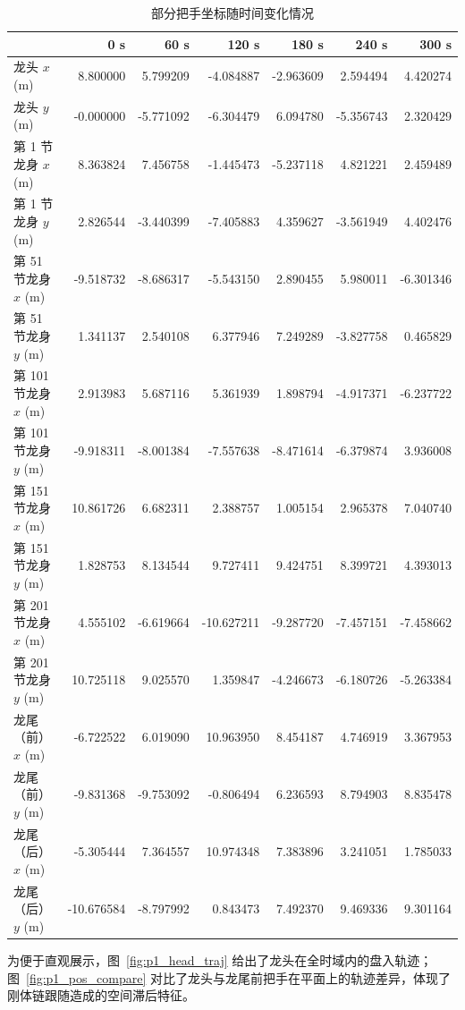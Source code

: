 \documentclass[12pt,a4paper]{ctexart}
\begin{document}
\begin{table}[H]
\centering
\caption{部分把手坐标随时间变化情况}
\label{tab:handle_positions}
\begin{tabular}{lrrrrrr}
\toprule
 & 0 s & 60 s & 120 s & 180 s & 240 s & 300 s \\
\midrule
龙头 $x$ (m) & 8.800000 & 5.799209 & -4.084887 & -2.963609 & 2.594494 & 4.420274 \\
龙头 $y$ (m) & -0.000000 & -5.771092 & -6.304479 & 6.094780 & -5.356743 & 2.320429 \\
第 1 节龙身 $x$ (m) & 8.363824 & 7.456758 & -1.445473 & -5.237118 & 4.821221 & 2.459489 \\
第 1 节龙身 $y$ (m) & 2.826544 & -3.440399 & -7.405883 & 4.359627 & -3.561949 & 4.402476 \\
第 51 节龙身 $x$ (m) & -9.518732 & -8.686317 & -5.543150 & 2.890455 & 5.980011 & -6.301346 \\
第 51 节龙身 $y$ (m) & 1.341137 & 2.540108 & 6.377946 & 7.249289 & -3.827758 & 0.465829 \\
第 101 节龙身 $x$ (m) & 2.913983 & 5.687116 & 5.361939 & 1.898794 & -4.917371 & -6.237722 \\
第 101 节龙身 $y$ (m) & -9.918311 & -8.001384 & -7.557638 & -8.471614 & -6.379874 & 3.936008 \\
第 151 节龙身 $x$ (m) & 10.861726 & 6.682311 & 2.388757 & 1.005154 & 2.965378 & 7.040740 \\
第 151 节龙身 $y$ (m) & 1.828753 & 8.134544 & 9.727411 & 9.424751 & 8.399721 & 4.393013 \\
第 201 节龙身 $x$ (m) & 4.555102 & -6.619664 & -10.627211 & -9.287720 & -7.457151 & -7.458662 \\
第 201 节龙身 $y$ (m) & 10.725118 & 9.025570 & 1.359847 & -4.246673 & -6.180726 & -5.263384 \\
龙尾（前） $x$ (m) & -6.722522 & 6.019090 & 10.963950 & 8.454187 & 4.746919 & 3.367953 \\
龙尾（前） $y$ (m) & -9.831368 & -9.753092 & -0.806494 & 6.236593 & 8.794903 & 8.835478 \\
龙尾（后） $x$ (m) & -5.305444 & 7.364557 & 10.974348 & 7.383896 & 3.241051 & 1.785033 \\
龙尾（后） $y$ (m) & -10.676584 & -8.797992 & 0.843473 & 7.492370 & 9.469336 & 9.301164 \\
\bottomrule
\end{tabular}
\end{table}


为便于直观展示，图~\ref{fig:p1_head_traj} 给出了龙头在全时域内的盘入轨迹；图~\ref{fig:p1_pos_compare} 对比了龙头与龙尾前把手在平面上的轨迹差异，体现了刚体链跟随造成的空间滞后特征。
\end{document}
